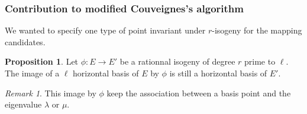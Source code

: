 \documentclass[10pt,a4paper]{beamer}
\theoremstyle{plain}
\theoremstyle{definition}
\theoremstyle{definition}
\theoremstyle{definition}
\newtheorem{prop}[thm]{Proposition}
\theoremstyle{definition}
\theoremstyle{remark}
\newtheorem{rem}[thm]{Remark}
\theoremstyle{remark}
\begin{document}
%
%
%
%
%
%
%
%



%

\begin{frame}
\frametitle{Contribution to modified Couveignes's algorithm}
We wanted to specify one type of point invariant under $r$-isogeny for the mapping candidates.
\begin{prop}
Let $\phi:E\rightarrow E'$ be a rationnal isogeny of degree $r$ prime to $\ell$. The image of a $\ell$ horizontal basis of $E$ by $\phi$ is still a horizontal basis of $E'$.
\end{prop}

\begin{rem}
This image by $\phi$ keep the association between a basis point and the eigenvalue $\lambda$ or $\mu$. 
\end{rem}

\end{frame}
\end{document}
